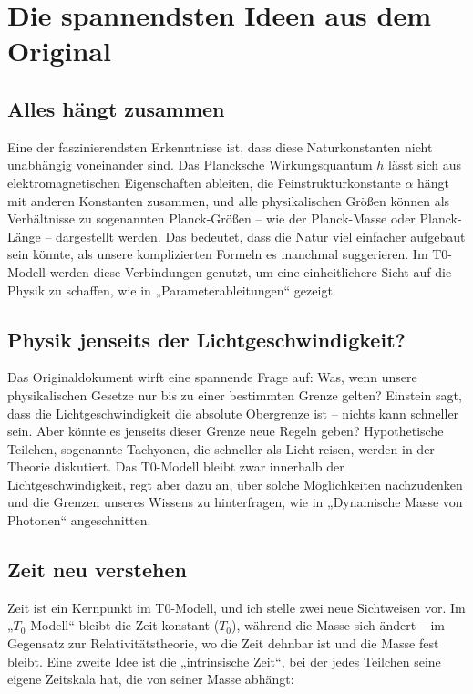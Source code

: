 \documentclass[a4paper,12pt]{article}
\begin{document}
	\section{Die spannendsten Ideen aus dem Original}
	
	\subsection{Alles hängt zusammen}
	
	Eine der faszinierendsten Erkenntnisse ist, dass diese Naturkonstanten nicht unabhängig voneinander sind. Das Plancksche Wirkungsquantum \(h\) lässt sich aus elektromagnetischen Eigenschaften ableiten, die Feinstrukturkonstante \(\alpha\) hängt mit anderen Konstanten zusammen, und alle physikalischen Größen können als Verhältnisse zu sogenannten Planck-Größen – wie der Planck-Masse oder Planck-Länge – dargestellt werden. Das bedeutet, dass die Natur viel einfacher aufgebaut sein könnte, als unsere komplizierten Formeln es manchmal suggerieren. Im T0-Modell werden diese Verbindungen genutzt, um eine einheitlichere Sicht auf die Physik zu schaffen, wie in „Parameterableitungen“ \cite{pascher_params_2025} gezeigt.
	
	\subsection{Physik jenseits der Lichtgeschwindigkeit?}
	
	Das Originaldokument wirft eine spannende Frage auf: Was, wenn unsere physikalischen Gesetze nur bis zu einer bestimmten Grenze gelten? Einstein sagt, dass die Lichtgeschwindigkeit die absolute Obergrenze ist – nichts kann schneller sein. Aber könnte es jenseits dieser Grenze neue Regeln geben? Hypothetische Teilchen, sogenannte Tachyonen, die schneller als Licht reisen, werden in der Theorie diskutiert. Das T0-Modell bleibt zwar innerhalb der Lichtgeschwindigkeit, regt aber dazu an, über solche Möglichkeiten nachzudenken und die Grenzen unseres Wissens zu hinterfragen, wie in „Dynamische Masse von Photonen“ \cite{pascher_photons_2025} angeschnitten.
	
	\subsection{Zeit neu verstehen}
	
	Zeit ist ein Kernpunkt im T0-Modell, und ich stelle zwei neue Sichtweisen vor. Im „\(T_0\)-Modell“ bleibt die Zeit konstant (\(T_0\)), während die Masse sich ändert – im Gegensatz zur Relativitätstheorie, wo die Zeit dehnbar ist und die Masse fest bleibt. Eine zweite Idee ist die „intrinsische Zeit“, bei der jedes Teilchen seine eigene Zeitskala hat, die von seiner Masse abhängt:
	
\end{document}

